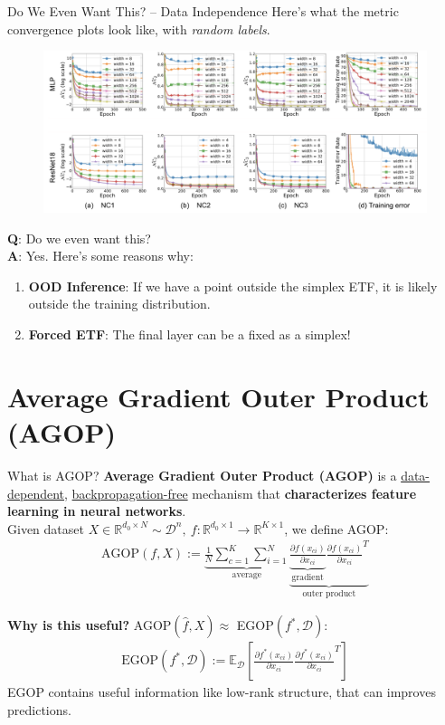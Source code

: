 \documentclass{beamer}
\begin{document}
\begin{frame}{Do We Even Want This? -- Data Independence}
	Here's what the metric convergence plots look like, with \textit{random labels}.
	\begin{figure}[H]
		\centering
		\includegraphics[width=.8\textwidth]{img/nc_random_labels.png}
	\end{figure} \pause
	\vspace{-1em}
	\textbf{Q}: Do we even want this? \pause \\
	\textbf{A}: Yes. Here's some reasons why:
	\begin{enumerate}[label=\arabic*.]
		\item \textbf{OOD Inference}: If we have a point outside the simplex ETF, it is likely outside the training distribution. \pause
		\item \textbf{Forced ETF}: The final layer can be a fixed as a simplex!
	\end{enumerate}
\end{frame}

\section{Average Gradient Outer Product (AGOP)}
\begin{frame}{What is AGOP?}
	\textbf{Average Gradient Outer Product (AGOP)} is a \underline{data-dependent}, \underline{backpropagation-free} mechanism that \textbf{characterizes feature learning in neural networks}. \pause \newline \\

	Given dataset $X \in \mathbb{R}^{d_0 \times N} \sim \mathcal{D}^n,\ f: \mathbb{R}^{d_0 \times 1} \rightarrow \mathbb{R}^{K \times 1}$, we define AGOP:
	\begin{gather}
		\text{AGOP}(f, X) := \underbrace{\frac{1}{N} \sum^K_{c=1} \sum^N_{i=1}}_{\text{average}} \underbrace{\underbrace{\frac{\partial f(x_{ci})}{\partial x_{ci}}}_{\text{gradient}} \frac{\partial f(x_{ci})}{\partial x_{ci}}^{T}}_{\text{outer product}}
	\end{gather} \pause

	\vspace{-1em}
	\textbf{Why is this useful?} \pause
	AGOP$(\hat{f}, X) \approx $ EGOP$(f^*, \mathcal{D})$:
	\begin{gather}
		\text{EGOP}(f^*, \mathcal{D}) := \mathbb{E}_{\mathcal{D}} \left[ \frac{\partial f^*(x_{ci})}{\partial x_{ci}} \frac{\partial f^*(x_{ci})}{\partial x_{ci}}^{T} \right]
	\end{gather} \pause
	EGOP contains useful information like low-rank structure, that can improves predictions.
\end{frame}
\end{document}
